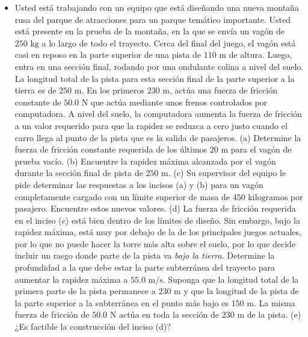 \documentclass[11pt,a4paper]{article}
\begin{document}
\begin{itemize}
    \item[\textbf{25.}] Usted está trabajando con un equipo que está diseñando una nueva montaña rusa del parque de atracciones para un parque temático importante. Usted está presente en la prueba de la montaña, en la que se envía un vagón de $250 \text{ kg}$ a lo largo de todo el trayecto. Cerca del final del juego, el vagón está casi en reposo en la parte superior de una pista de $110 \text{ m}$ de altura. Luego, entra en una sección final, rodando por una ondulante colina a nivel del suelo. La longitud total de la pista para esta sección final de la parte superior a la tierra es de $250 \text{ m}$. En los primeros $230 \text{ m}$, actúa una fuerza de fricción constante de $50.0 \text{ N}$ que actúa mediante unos frenos controlados por computadora. A nivel del suelo, la computadora aumenta la fuerza de fricción a un valor requerido para que la rapidez se reduzca a cero justo cuando el carro llega al punto de la pista que es la salida de pasajeros. (a) Determine la fuerza de fricción constante requerida de los últimos $20 \text{ m}$ para el vagón de prueba vacío. (b) Encuentre la rapidez máxima alcanzada por el vagón durante la sección final de pista de $250 \text{ m}$. (c) Su supervisor del equipo le pide determinar las respuestas a los incisos (a) y (b) para un vagón completamente cargado con un límite superior de masa de $450 \text{ kilogramos}$ por pasajero. Encuentre estos nuevos valores. (d) La fuerza de fricción requerida en el inciso (c) está bien dentro de los límites de diseño. Sin embargo, bajo la rapidez máxima, está muy por debajo de la de los principales juegos actuales, por lo que no puede hacer la torre más alta sobre el suelo, por lo que decide incluir un rasgo donde parte de la pista va \textit{bajo la tierra}. Determine la profundidad a la que debe estar la parte subterránea del trayecto para aumentar la rapidez máxima a $55.0 \text{ m/s}$. Suponga que la longitud total de la primera parte de la pista permanece a $230 \text{ m}$ y que la longitud de la pista de la parte superior a la subterránea en el punto más bajo es $150 \text{ m}$. La misma fuerza de fricción de $50.0 \text{ N}$ actúa en toda la sección de $230 \text{ m}$ de la pista. (e) ¿Es factible la construcción del inciso (d)?
    \vspace*{8cm}


\end{itemize}
\end{document}
